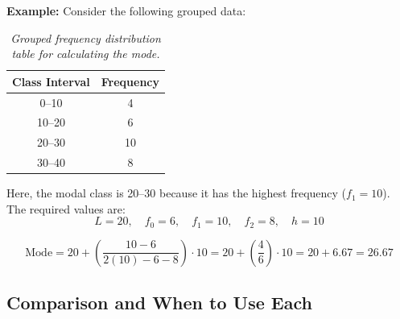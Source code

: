 \documentclass[twoside]{book}
\begin{document}
\begin{enumerate}
\begin{center}
\end{center}

\textbf{Example:} Consider the following grouped data:

\begin{table}[H]
\begin{center}
	\begin{tabular}{c|c}
		\toprule
		\textbf{Class Interval} & \textbf{Frequency} \\
		\midrule
		0--10 & 4 \\
		10--20 & 6 \\
		20--30 & 10 \\
		30--40 & 8 \\
		\bottomrule
	\end{tabular}
\end{center}
\caption{\textit{Grouped frequency distribution table for calculating the mode.}}
\end{table}

Here, the modal class is 20--30 because it has the highest frequency (\( f_1 = 10 \)). The required values are:
\[
L = 20, \quad f_0 = 6, \quad f_1 = 10, \quad f_2 = 8, \quad h = 10
\]

\[
\text{Mode} = 20 + \left( \frac{10 - 6}{2(10) - 6 - 8} \right) \cdot 10 = 20 + \left( \frac{4}{6} \right) \cdot 10 = 20 + 6.67 = 26.67
\]

\end{enumerate}


\subsection{Comparison and When to Use Each}
\end{document}

